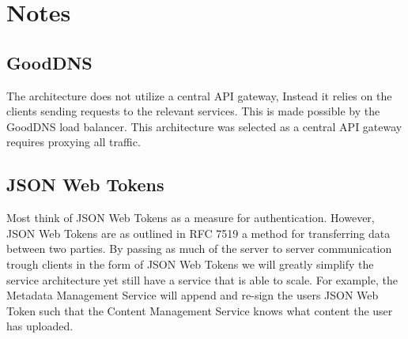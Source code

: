 \documentclass[12pt]{article}
\begin{document}
\clearpage

\section{Notes}

\subsection{GoodDNS}
The architecture does not utilize a central API gateway, Instead it relies on the clients sending requests to the relevant services.
This is made possible by the GoodDNS\cite{heimonenSlenderman00GoodDns2023} load balancer. This architecture was selected as a central
API gateway requires proxying all traffic.

\subsection{JSON Web Tokens}
Most think of JSON Web Tokens as a measure for authentication. However, JSON Web Tokens are as outlined in RFC 7519\cite{jonesJSONWebToken2015} a method
for transferring data between two parties. By passing as much of the server to server communication trough clients in the form of
JSON Web Tokens we will greatly simplify the service architecture yet still have a service that is able to scale.
For example, the Metadata Management Service will append and re-sign the users JSON Web Token such that the Content Management
Service knows what content the user has uploaded.


\pagebreak
\printbibliography
\end{document}
